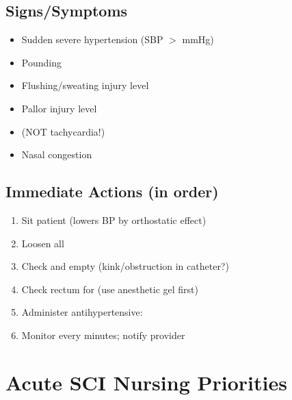 \documentclass[11pt]{article}
\begin{document}
\subsection{Signs/Symptoms}
\begin{itemize}
    \item Sudden severe hypertension (SBP $>$ \underline{\hspace{2cm}} mmHg)
    \item Pounding \underline{\hspace{2cm}}
    \item Flushing/sweating \underline{\hspace{2cm}} injury level
    \item Pallor \underline{\hspace{2cm}} injury level
    \item \underline{\hspace{2cm}} (NOT tachycardia!)
    \item Nasal congestion
\end{itemize}

\subsection{Immediate Actions (in order)}
\begin{enumerate}
    \item Sit patient \underline{\hspace{2cm}} (lowers BP by orthostatic effect)
    \item Loosen all \underline{\hspace{3cm}}
    \item Check and empty \underline{\hspace{2cm}} (kink/obstruction in catheter?)
    \item Check rectum for \underline{\hspace{2cm}} (use anesthetic gel first)
    \item Administer antihypertensive: \underline{\hspace{2cm}}
    \item Monitor every \underline{\hspace{2cm}} minutes; notify provider
\end{enumerate}

\hrulefill

\section{Acute SCI Nursing Priorities}
\end{document}
